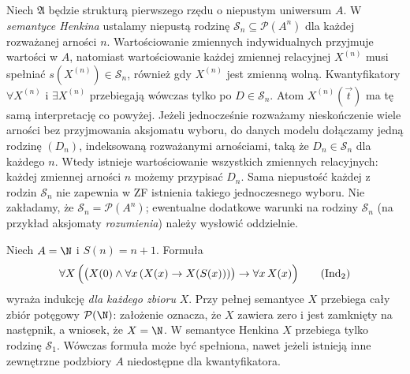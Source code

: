\begin{definicja}\label{def:second-order-henkin-semantics}
Niech $\mathfrak A$ będzie strukturą pierwszego rzędu
o niepustym uniwersum $A$. W \emph{semantyce Henkina} ustalamy
niepustą rodzinę $\mathcal S_n\subseteq\mathcal P(A^n)$ dla
każdej rozważanej arności $n$. Wartościowanie zmiennych
indywidualnych przyjmuje wartości w $A$, natomiast
wartościowanie każdej zmiennej relacyjnej $X^{(n)}$
musi spełniać $s(X^{(n)})\in\mathcal S_n$,
również gdy $X^{(n)}$ jest zmienną wolną.
Kwantyfikatory $\forall X^{(n)}$ i $\exists X^{(n)}$
przebiegają wówczas tylko po $D\in\mathcal S_n$.
Atom $X^{(n)}(\vec t)$ ma tę samą interpretację co powyżej.
Jeżeli jednocześnie rozważamy nieskończenie wiele arności
bez przyjmowania aksjomatu wyboru, do danych modelu
dołączamy jedną rodzinę $(D_n)$, indeksowaną rozważanymi
arnościami, taką że $D_n\in\mathcal S_n$ dla każdego $n$.
Wtedy istnieje wartościowanie wszystkich zmiennych relacyjnych:
każdej zmiennej arności $n$ możemy przypisać $D_n$.
Sama niepustość każdej z rodzin $\mathcal S_n$ nie zapewnia
w ZF istnienia takiego jednoczesnego wyboru.
Nie zakładamy, że
$\mathcal S_n=\mathcal P(A^n)$; ewentualne dodatkowe warunki
na rodziny $\mathcal S_n$ (na przykład aksjomaty
\emph{rozumienia}) należy wysłowić oddzielnie.
\end{definicja}

\begin{przyklad}
Niech $A=\N$ i $S(n)=n+1$. Formuła
\[
\forall X\,\Bigl(\bigl(X(0)\land
\forall x\,(X(x)\to X(S(x)))\bigr)
\to\forall x\,X(x)\Bigr)
\tag{$\mathrm{Ind}_2$}
\]
wyraża indukcję \emph{dla każdego zbioru} $X$.
Przy pełnej semantyce $X$ przebiega cały zbiór potęgowy
$\mathcal P(\N)$: założenie oznacza, że $X$ zawiera zero
i jest zamknięty na następnik, a wniosek, że $X=\N$.
W semantyce Henkina $X$ przebiega tylko rodzinę
$\mathcal S_1$. Wówczas formuła może być spełniona,
nawet jeżeli istnieją inne zewnętrzne podzbiory $A$
niedostępne dla kwantyfikatora.
\end{przyklad}

